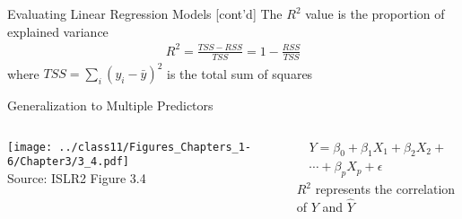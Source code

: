 \documentclass[ignorenonframetext,xcolor=x11names]{beamer}
\begin{document}
\begin{frame}{Evaluating Linear Regression Models \small [cont'd]}
The $R^2$ value is the proportion of explained variance
\begin{align*}
R^2 = \frac{TSS - RSS}{TSS} = 1 - \frac{RSS}{TSS}
\end{align*}
where $TSS = \sum_i(y_i - \bar{y})^2$ is the total sum of squares
\end{frame}

\begin{frame}{Generalization to Multiple Predictors}
\begin{columns}
\begin{column}{0.65\textwidth}
\texttt{[image: ../class11/Figures\_Chapters\_1-6/Chapter3/3\_4.pdf]}  \\
\scriptsize Source: ISLR2 Figure 3.4
\end{column}
\begin{column}{0.35\textwidth}
\begin{multline*}
Y = \beta_0 + \beta_1 X_1 + \beta_2 X_2 + \\
\cdots + \beta_p X_p + \epsilon
\end{multline*}
$R^2$ represents the correlation of $Y$ and $\hat{Y}$
\end{column}
\end{columns}
\end{frame}
\end{document}
